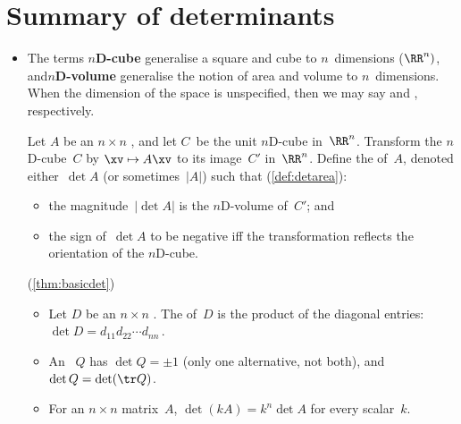 
\section{Summary of determinants}
\label{sec:sumd}


\begin{itemize}
\def\index#1{}%

\itemhi The `graphical formula'~\eqref{eq:dets23b} for \(2\times2\) and \(3\times3\) determinants are useful for both theory and many practical small problems.


\subsubsection*{Geometry underlies determinants}

\item The terms \index{nD-cube@$n$D-cube|textbf}\textbf{$n$D-cube}  generalise a square and cube to \(n\)~dimensions (\(\RR^n)\), and\index{nD-volume@$n$D-volume|textbf}\textbf{$n$D-volume} generalise the notion of area and volume to \(n\)~dimensions.
When the dimension of the space is unspecified, then we may say  and , respectively.

\itemhi Let \(A\) be an \(n\times n\) , and let \(C\)~be the unit \index{nD-cube@$n$D-cube}$n$D-cube in~\(\RR^n\).
Transform the \(n\)D-cube~\(C\) by \(\xv\mapsto A\xv\) to its image~\(C'\) in~\(\RR^n\). 
Define the  of~\(A\), denoted either~\(\det A\) (or sometimes~\(|A|\)) such that (\autoref{def:detarea}):  \begin{itemize}
\item the magnitude~\(|\det A|\) is the \index{nD-volume@$n$D-volume}$n$D-volume of~\(C'\); and 
\item the sign of~\(\det A\) to be negative iff the transformation reflects the orientation of the $n$D-cube.
\end{itemize}

\itemhi (\autoref{thm:basicdet})
\begin{itemize}
\item   Let \(D\) be an \(n\times n\) .
The  of~\(D\) is the product of the diagonal entries: \(\det D=d_{11}d_{22}\cdots d_{nn}\)\,.
\item  An ~\(Q\) has  \(\det Q=\pm1\) (only one alternative, not both), and \(\det Q=\det(\tr Q)\).
\item   For an \(n\times n\) matrix~\(A\), \(\det(kA)=k^n\det A\) for every scalar~\(k\).
\end{itemize}


\end{itemize}
